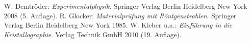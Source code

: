 \documentclass[a4paper,twoside,final]{article}
\begin{document}

\begin{thebibliography}{xxx}
	W. Demtröder: \textit{Experimentalphysik}. Springer Verlag Berlin Heidelberg New York 2008 (5. Auflage).
	R. Glocker: \textit{Materialprüfung mit Röntgenstrahlen}. Springer Verlag Berlin Heidelberg New York 1985.
	W. Kleber u.a.: \textit{Einführung in die Kristallographie}. Verlag Technik GmbH 2010 (19. Auflage).
\end{thebibliography}
\end{document}
